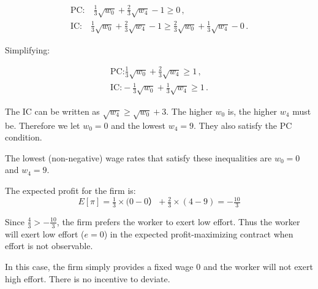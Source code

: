 \documentclass{article}
\begin{document}
\begin{gather*}
 \text{PC:} \quad \tfrac13\sqrt{w_0} + \tfrac23\sqrt{w_4} - 1 \geq 0  \, ,\\
 \text{IC:} \quad   \tfrac13\sqrt{w_0} + \tfrac23\sqrt{w_4} - 1 \geq \tfrac23\sqrt{w_0} + \tfrac13\sqrt{w_4} -0 \, .
\end{gather*}

Simplifying:

\begin{gather*}
 \text{PC:}   \tfrac13 \sqrt{w_0} + \tfrac23 \sqrt{w_4} \geq 1  \, ,\\
 \text{IC:}    -\tfrac13 \sqrt{w_0} + \tfrac13 \sqrt{w_4} \geq 1  \, .
\end{gather*}

\begin{mdframed}[backgroundcolor=blue!20,linecolor=white]
The IC can be written as $\sqrt{w_4} \geq  \sqrt{w_0} + 3$. The higher $w_0$ is, the higher $w_4$ must be. Therefore we let $w_0=0$ and the lowest $w_4=9$. They also satisfy the PC condition.
\end{mdframed}

The lowest (non-negative) wage rates that satisfy these inequalities are $w_0 = 0$ and $w_4 = 9$.


The expected profit for the firm is: 
$$ E[\pi]=\tfrac13 \times (0-0） + \tfrac23 \times (4 -9) = - \tfrac{10}3$$

Since $\tfrac43 > - \tfrac{10}3$, the firm prefers the worker to exert low effort. Thus the worker will exert low effort ($e=0$) in the expected profit-maximizing contract when effort is not observable.

\begin{mdframed}[backgroundcolor=blue!20,linecolor=white]
In this case, the firm simply provides a fixed wage 0 and the worker will not exert high effort. There is no incentive to deviate.
\end{mdframed}
\end{document}
